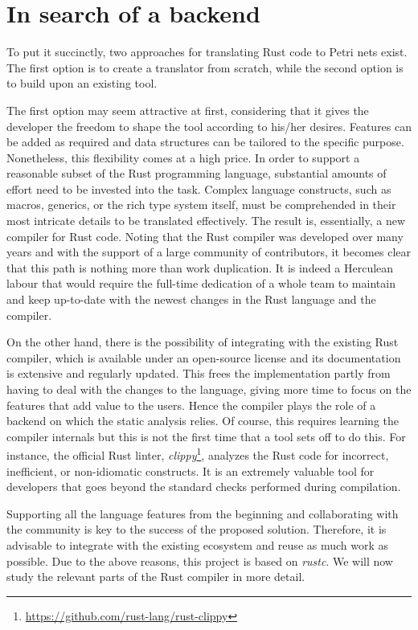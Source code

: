 \documentclass[../Thesis.tex]{subfiles}
\begin{document}
\section{In search of a backend}

To put it succinctly, two approaches for translating Rust code to Petri nets exist.
The first option is to create a translator from scratch,
while the second option is to build upon an existing tool.

The first option may seem attractive at first,
considering that it gives the developer
the freedom to shape the tool according to his/her desires.
Features can be added as required and
data structures can be tailored to the specific purpose.
Nonetheless, this flexibility comes at a high price.
In order to support a reasonable subset of the Rust programming language,
substantial amounts of effort need to be invested into the task.
Complex language constructs, such as macros, generics, or the rich type system itself,
must be comprehended in their most intricate details to be translated effectively.
The result is, essentially, a new compiler for Rust code.
Noting that the Rust compiler was developed over many years and
with the support of a large community of contributors,
it becomes clear that this path is nothing more than work duplication.
It is indeed a Herculean labour that would require the full-time dedication of a whole team
to maintain and keep up-to-date with the newest changes in the Rust language and the compiler.

On the other hand, there is the possibility
of integrating with the existing Rust compiler,
which is available under an open-source license
and its documentation is extensive and regularly updated.
This frees the implementation partly from having to deal with the changes to the language,
giving more time to focus on the features that add value to the users.
Hence the compiler plays the role of a backend on which the static analysis relies.
Of course, this requires learning the compiler internals
but this is not the first time that a tool sets off to do this.
For instance, the official Rust linter,
\emph{clippy}\footnote{\url{https://github.com/rust-lang/rust-clippy}},
analyzes the Rust code for incorrect, inefficient, or non-idiomatic constructs.
It is an extremely valuable tool for developers that goes beyond the standard checks
performed during compilation.

Supporting all the language features from the beginning
and collaborating with the community is key to the success of the proposed solution.
Therefore, it is advisable to integrate with the existing ecosystem
and reuse as much work as possible.
Due to the above reasons, this project is based on \emph{rustc}.
We will now study the relevant parts of the Rust compiler in more detail.
\end{document}
